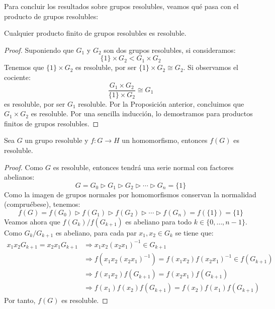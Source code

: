 \noindent
Para concluir los resultados sobre grupos resolubles, veamos qué pasa con el producto de grupos resolubles:

\begin{coro}
    Cualquier producto finito de grupos resolubles es resoluble.
    \begin{proof}
        Suponiendo que $G_1$ y $G_2$ son dos grupos resolubles, si consideramos:
        \begin{equation*}
            \{1\} \times G_2 < G_1\times G_2
        \end{equation*}
        Tenemos que $\{1\}\times G_2$ es resoluble, por ser $\{1\}\times G_2\cong G_2$. Si observamos el cociente:
        \begin{equation*}
            \dfrac{G_1\times G_2}{\{1\}\times G_2} \cong G_1
        \end{equation*}
        es resoluble, por ser $G_1$ resoluble. Por la Proposición anterior, concluimos que $G_1\times G_2$ es resoluble. Por una sencilla inducción, lo demostramos para productos finitos de grupos resolubles.
    \end{proof}
\end{coro}

\begin{prop}
    Sea $G$ un grupo resoluble y $f:G\to H$ un homomorfismo, entonces $f(G)$ es resoluble.
\end{prop}
\begin{proof}
    Como $G$ es resoluble, entonces tendrá una serie normal con factores abelianos:
    \begin{equation*}
        G=G_0 \rhd G_1 \rhd G_2 \rhd \cdots \rhd G_n = \{1\}
    \end{equation*}
    Como la imagen de grupos normales por homomorfismos conservan la normalidad (compruébese), tenemos:
    \begin{equation*}
        f(G)=f(G_0) \rhd f(G_1) \rhd f(G_2) \rhd \cdots \rhd f(G_n) = f(\{1\}) = \{1\}
    \end{equation*}
    Veamos ahora que $f(G_k)/f(G_{k+1})$ es abeliano para todo $k\in\{0,\ldots,n-1\}$. Como $G_k/G_{k+1}$ es abeliano, para cada par $x_1,x_2\in G_k$ se tiene que:
    \begin{align*}
        x_1x_2G_{k+1} = x_2x_1G_{k+1}&\Longrightarrow
        x_1x_2(x_2x_1)^{-1} \in G_{k+1}
        \\&\Longrightarrow
        f(x_1x_2(x_2x_1)^{-1})=f(x_1x_2)f(x_2x_1)^{-1} \in f(G_{k+1})
        \\&\Longrightarrow
        f(x_1x_2)f(G_{k+1}) = f(x_2x_1)f(G_{k+1})
        \\&\Longrightarrow
        f(x_1)f(x_2)f(G_{k+1}) = f(x_2)f(x_1)f(G_{k+1})
    \end{align*}
    Por tanto, $f(G)$ es resoluble.
\end{proof}
